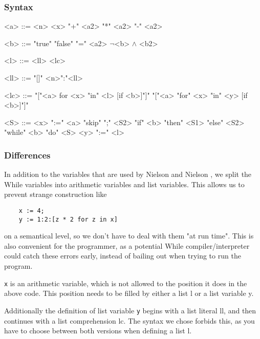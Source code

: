 \documentclass[12pt]{article}
\newcommand\mono\texttt
\newcommand{\metavar}[1]{\textlangle#1\textrangle}
\begin{document}
\subsubsection{Syntax}

\begin{grammar}
    <a> ::= <n>
    \alt <x>
     "+" <a2>
     "*" <a2>
     "-" <a2>

    <b> ::= "true"
    \alt "false"
     "=" <a2>
    \alt $\lnot$<b>
     $\land$ <b2>

    <l> ::= <ll>
    \alt <lc>

    <ll> ::= "[]"
    \alt <n>":"<ll>

    <lc> ::= "["<a> for <x> "in" <l> [if <b>]"]"
    \alt "["<a> "for" <x> "in" <y> [if <b>]"]"

    <S> ::= <x> ":=" <a>
    \alt "skip"
     ";" <S2>
    \alt "if" <b> "then" <S1> "else" <S2>
    \alt "while" <b> "do" <S>
    \alt <y> ":=" <l>
\end{grammar}

\subsubsection{Differences}

In addition to the variables that are used by Nielson and Nielson \cite{wiley}, we split the While variables into arithmetic variables and list variables. This allows us to prevent strange construction like

\begin{lstlisting}
    x := 4;
    y := 1:2:[z * 2 for z in x]
\end{lstlisting}

on a semantical level, so we don't have to deal with them "at run time". This is also convenient for the programmer, as a potential While compiler/interpreter could catch these errors early, instead of bailing out when trying to run the program.

\mono{x} is an arithmetic variable, which is not allowed to the position it does in the above code. This position needs to be filled by either a list \metavar{l} or a list variable \metavar{y}.

Additionally the definition of list variable \mono{y} begins with a list literal \metavar{ll}, and then continues with a list comprehension \metavar{lc}. The syntax we chose forbids this, as you have to choose between both versions when defining a list \metavar{l}.
\end{document}
